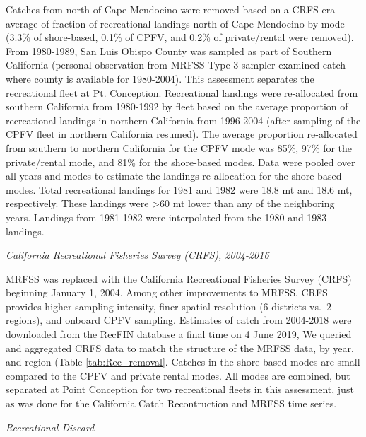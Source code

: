 \documentclass[12pt,]{article}
\begin{document}
Catches from north of Cape Mendocino were removed based on a CRFS-era
average of fraction of recreational landings north of Cape Mendocino by
mode (3.3\% of shore-based, 0.1\% of CPFV, and 0.2\% of private/rental
were removed). From 1980-1989, San Luis Obispo County was sampled as
part of Southern California (personal observation from MRFSS Type 3
sampler examined catch where county is available for 1980-2004). This
assessment separates the recreational fleet at Pt. Conception.
Recreational landings were re-allocated from southern California from
1980-1992 by fleet based on the average proportion of recreational
landings in northern California from 1996-2004 (after sampling of the
CPFV fleet in northern California resumed). The average proportion
re-allocated from southern to northern California for the CPFV mode was
85\%, 97\% for the private/rental mode, and 81\% for the shore-based
modes. Data were pooled over all years and modes to estimate the
landings re-allocation for the shore-based modes. Total recreational
landings for 1981 and 1982 were 18.8 mt and 18.6 mt, respectively. These
landings were \textgreater{}60 mt lower than any of the neighboring
years. Landings from 1981-1982 were interpolated from the 1980 and 1983
landings.

\emph{California Recreational Fisheries Survey (CRFS), 2004-2016}

MRFSS was replaced with the California Recreational Fisheries Survey
(CRFS) beginning January 1, 2004. Among other improvements to MRFSS,
CRFS provides higher sampling intensity, finer spatial resolution (6
districts vs.~2 regions), and onboard CPFV sampling. Estimates of catch
from 2004-2018 were downloaded from the RecFIN database a final time on
4 June 2019, We queried and aggregated CRFS data to match the structure
of the MRFSS data, by year, and region (Table \ref{tab:Rec_removal}.
Catches in the shore-based modes are small compared to the CPFV and
private rental modes. All modes are combined, but separated at Point
Conception for two recreational fleets in this assessment, just as was
done for the California Catch Recontruction and MRFSS time series.

\emph{Recreational Discard}
\end{document}
